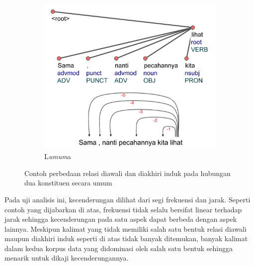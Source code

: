 \begin{figure}
\begin{subfigure}{.46\linewidth}
  \includegraphics[width=1\linewidth]{pics/ls7375.jpg} 
	\caption{L\textit{umum}a}
	\label{fig:ls7375} 
\end{subfigure}

\caption{Contoh perbedaan relasi diawali dan diakhiri induk pada hubungan dua konstituen secara umum}
\label{fig:umumcontoh}
\end{figure}

Pada uji analisis ini, kecenderungan dilihat dari segi frekuensi dan jarak. Seperti contoh yang dijabarkan di atas, frekuensi tidak selalu bersifat linear terhadap jarak sehingga kecenderungan pada satu aspek dapat berbeda dengan aspek lainnya. Meskipun kalimat yang tidak memiliki salah satu bentuk relasi diawali maupun diakhiri induk seperti di atas tidak banyak ditemukan, banyak kalimat dalam kedua korpus data yang didominasi oleh salah satu bentuk sehingga menarik untuk dikaji kecenderungannya.

